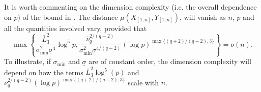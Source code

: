 \documentclass[aos]{imsart}
\begin{document}

It is worth commenting on the dimension complexity (i.e. the overall dependence on $p$) of the bound in . The distance $\mu(X_{[1,n]}, Y_{[1,n]})$, will vanish as $n$, $p$ and all the quantities involved vary, provided that  
\begin{equation}\label{eq:rate}
\max\left\{ \frac{\bar{L}_3^2}{\sigma_{\min}^2 \underline{\sigma}^4} \log^5 p, \frac{\bar{\nu}_q^{2/(q-2)}}{\sigma_{\min}^2 \underline{\sigma}^{4/(q-2)}} (\log p)^{\max\{(q+2)/(q-2), 3\}}\right\} = o(n).
\end{equation}
To illustrate, if $\sigma_{\min}$ and $\underline{\sigma}$ are of constant order, the dimension complexity will depend on how  the terms $\bar{L}_3^2 \log^5(p)$ and $\bar{\nu}_q^{2/(q-2)} (\log p)^{\max\{(q+2)/(q-2), 3\}}$ scale with $n$.
\end{document}
